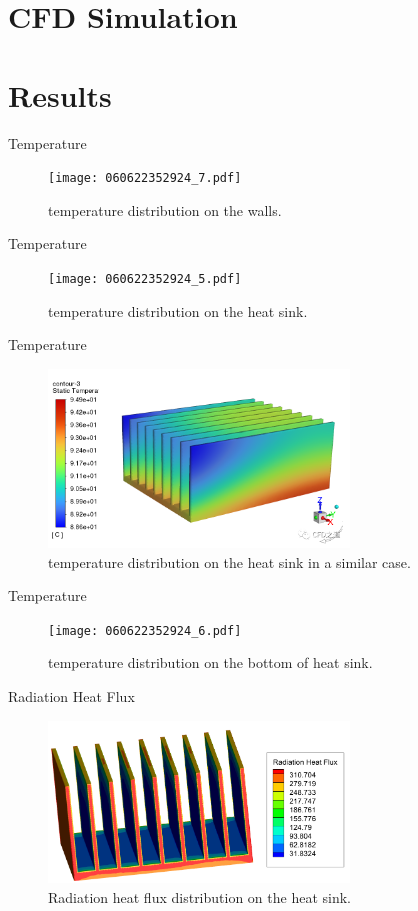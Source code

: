 \documentclass[10pt, xcolor=table]{beamer}
\begin{document}
\section{CFD Simulation}

\section{Results}
\begin{frame}{Temperature}
	\begin{figure}
		\texttt{[image: 060622352924\_7.pdf]}
		\caption{temperature distribution on the walls.}
	\end{figure}
\end{frame}
\begin{frame}{Temperature}
	\begin{figure}
		\texttt{[image: 060622352924\_5.pdf]}
		\caption{temperature distribution on the heat sink.}
	\end{figure}	
\end{frame}
\begin{frame}{Temperature}
	\begin{figure}
		\includegraphics[width=8cm, trim={0 1cm 0 1cm}]{微信图片_20220606231543.png}
		\caption{temperature distribution on the heat sink in a similar case.}
	\end{figure}
\end{frame}
\begin{frame}{Temperature}
	\begin{figure}
		\texttt{[image: 060622352924\_6.pdf]}
		\caption{temperature distribution on the bottom of heat sink.}
	\end{figure}
\end{frame}
\begin{frame}{Radiation Heat Flux}
	\begin{figure}
		\includegraphics[width=8cm, trim={0 0cm 0 1cm}]{figure15.png}
		\caption{Radiation heat flux distribution on the heat sink.}
	\end{figure}
\end{frame}
\end{document}
